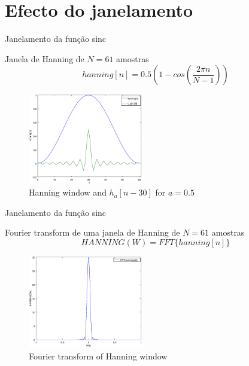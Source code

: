 \documentclass[envcountsect,dvips]{beamer}
\begin{document}
\section{Efecto do janelamento}
\begin{frame}{Janelamento da função sinc}
\begin{block}{Janela de Hanning de $N=61$ amostras}
 \begin{equation}
  hanning[n]=0.5(1-cos(\frac{2 \pi n }{N-1}))
 \end{equation}
\end{block}
\begin{figure}[!htb]
\centering
\includegraphics[width=5cm]{images/hanning.eps}
\caption{Hanning window and $h_a[n-30]$ for $a=0.5$}
\label{fig:hanningn}
\end{figure}  
\end{frame}

\begin{frame}{Janelamento da função sinc}
\begin{block}{Fourier transform  de uma janela de Hanning de $N=61$ amostras}
 \begin{equation}
  HANNING(W)=FFT\{hanning[n]\}
 \end{equation}
\end{block}
\begin{figure}[!htb]
\centering
\includegraphics[width=5cm]{images/hanningfft.eps}
\caption{Fourier transform of Hanning window}
\label{fig:hanningw}
\end{figure}  
\end{frame}
\end{document}

